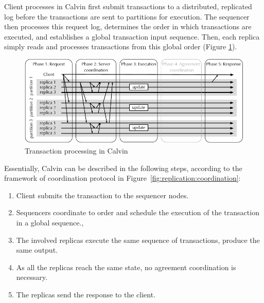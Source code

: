 Client processes in Calvin first submit transactions to a distributed,
replicated log before the transactions are sent to partitions for execution. The sequencer then
processes this request log, determines the order in which transactions are
executed, and establishes a global transaction input sequence. Then, each replica
simply reads and processes transactions from this global order (Figure
\ref{fig:calvin}).

\begin{figure}
  \begin{minipage}[b]{1.0\linewidth}
  \centering
        \includegraphics[width=1\linewidth]{figures/calvin}
  \end{minipage}
  \caption{Transaction processing in Calvin}
  \label{fig:calvin}
\end{figure}

Essentially, Calvin can be described in the following steps, according to
the framework of coordination protocol in
Figure~\ref{fig:replication:coordination}:

\begin{enumerate}
  \item Client submits the transaction to the sequencer nodes.
  \item Sequencers coordinate to order and schedule the execution of the transaction in a global sequence.,
  \item The involved replicas execute the same sequence of transactions, produce the same output.
  \item As all the replicas reach the same state, no agreement coordination is necessary.
  \item The replicas send the response to the client.
\end{enumerate}

